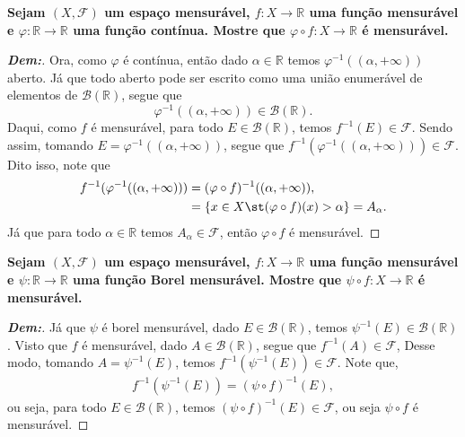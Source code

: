 \biglinend
\newpage
{}
\bigline 
\textbf{Sejam $(X, \mathcal F)$ um espaço mensurável, $f:X \rightarrow \mathbb R$ 
uma função mensurável e $\varphi: \mathbb R \rightarrow \mathbb R$ uma função contínua. 
Mostre que $\varphi \circ f: X \rightarrow \mathbb R$ é mensurável.}
\begin{proof}[\textbf{Dem:}]
  Ora, como $\varphi$ é contínua, então dado $\alpha \in \mathbb R$ temos $\varphi^{-1}((\alpha, +\infty))$ 
  aberto. Já que todo aberto pode ser escrito como uma união enumerável de elementos de $\mathcal B (\mathbb R)$,
  segue que $$\varphi^{-1}((\alpha, +\infty))\in \mathcal B(\mathbb R).$$
  Daqui, como $f$ é mensurável, para todo $E \in \mathcal B (\mathbb R)$, temos $f^{-1}(E) \in \mathcal F$. Sendo assim, 
 tomando $E = \varphi^{-1}((\alpha, +\infty))$, segue que $f^{-1}(\varphi^{-1}((\alpha, +\infty))) \in 
  \mathcal F$. Dito isso, note que 
  \begin{align*}
    f^{-1}(\varphi^{-1}((\alpha, +\infty))) &= (\varphi \circ f)^{-1}((\alpha, +\infty)),\\
    &=\{x \in X\st  (\varphi \circ f)(x) > \alpha\} = A_{\alpha}.
  \end{align*}
  Já que para todo $\alpha \in \mathbb R$ temos $A_{\alpha} \in \mathcal F$, então $\varphi \circ f$ é mensurável.
\end{proof}

\biglinend
{}
\bigline 
\textbf{Sejam $(X, \mathcal F)$ um espaço mensurável, $f:X \rightarrow \mathbb R$ 
uma função mensurável e $\psi: \mathbb R \rightarrow \mathbb R$ uma função Borel 
mensurável. Mostre que $\psi \circ f: X \rightarrow \mathbb R$ é mensurável.}
\begin{proof}[\textbf{Dem:}]
  Já que $\psi$ é borel mensurável, dado $E \in \mathcal B(\mathbb R)$, 
  temos $\psi^{-1}(E) \in \mathcal B(\mathbb R)$. Visto que $f$ é mensurável,  dado 
  $A \in \mathcal B(\mathbb R)$, segue que $f^{-1}(A) \in \mathcal F$, Desse modo, 
  tomando $A = \psi^{-1}(E)$, temos $f^{-1}(\psi^{-1}(E)) \in \mathcal F$. Note que, 
\begin{align*}
  f^{-1}(\psi^{-1}(E)) = (\psi \circ f)^{-1}(E),
\end{align*}
  ou seja, para todo $E \in \mathcal B(\mathbb R)$, temos $(\psi \circ f)^{-1}(E) \in \mathcal F$, ou seja 
  $\psi \circ f$ é mensurável.
\end{proof}


